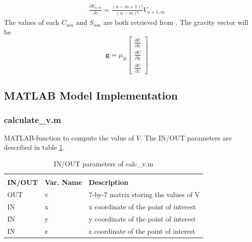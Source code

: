 \begin{gather}
    \frac{\partial V_{n,m}}{\partial z} = \frac{(n-m+1)!}{(n-m)!} V_{n+1,m}
\end{gather}
The values of each $C_{nm}$ and $S_{nm}$ are both retrieved from \cite{wertz2012spacecraft}.
The gravity vector will be
\begin{equation}
\boldsymbol{g}=\mu_{\oplus}\left[\begin{array}{l}
\frac{\partial U}{\partial x} \\
\frac{\partial U}{\partial y} \\
\frac{\partial U}{\partial z}
\end{array}\right]
\end{equation}

\subsection{MATLAB Model Implementation}

\subsubsection{calculate\_v.m}
MATLAB-function to compute the value of $V$. The IN/OUT parameters are described in table \ref{tab:v_grav}.
\begin{table}[H]
\centering
\caption{IN/OUT parameters of calc\_v.m}
\label{tab:v_grav}
\begin{tabular}{lll}
\rowcolor[HTML]{000000} 
\multicolumn{3}{l}{\cellcolor[HTML]{000000}{\color[HTML]{FFFFFF} calculate\_v.m: calculates the value of $d_{n,m}$ function}}                                                \\
\rowcolor[HTML]{000000} 
{\color[HTML]{FFFFFF} \textbf{IN/OUT}} & {\color[HTML]{FFFFFF} \textbf{Var. Name}} & {\color[HTML]{FFFFFF} \textbf{Description}} \\
OUT & v & 7-by-7 matrix storing the values of V\\
IN & x & x coordinate of the point of interest\\
IN & y & y coordinate of the point of interest\\
IN & z & z coordinate of the point of interest
\end{tabular}%
\end{table}
